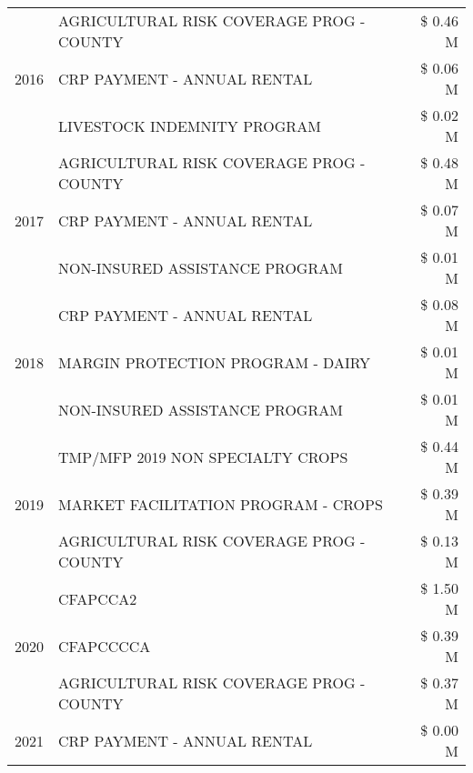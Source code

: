 \begin{tabular}{llr}
\cline{1-3}
\multirow[t]{3}{*}{2016} & AGRICULTURAL RISK COVERAGE PROG - COUNTY & \$ 0.46 M \\
 & CRP PAYMENT - ANNUAL RENTAL & \$ 0.06 M \\
 & LIVESTOCK INDEMNITY PROGRAM & \$ 0.02 M \\
\cline{1-3}
\multirow[t]{3}{*}{2017} & AGRICULTURAL RISK COVERAGE PROG - COUNTY & \$ 0.48 M \\
 & CRP PAYMENT - ANNUAL RENTAL & \$ 0.07 M \\
 & NON-INSURED ASSISTANCE PROGRAM & \$ 0.01 M \\
\cline{1-3}
\multirow[t]{3}{*}{2018} & CRP PAYMENT - ANNUAL RENTAL & \$ 0.08 M \\
 & MARGIN PROTECTION PROGRAM - DAIRY & \$ 0.01 M \\
 & NON-INSURED ASSISTANCE PROGRAM & \$ 0.01 M \\
\cline{1-3}
\multirow[t]{3}{*}{2019} & TMP/MFP 2019 NON SPECIALTY CROPS & \$ 0.44 M \\
 & MARKET FACILITATION PROGRAM - CROPS & \$ 0.39 M \\
 & AGRICULTURAL RISK COVERAGE PROG - COUNTY & \$ 0.13 M \\
\cline{1-3}
\multirow[t]{3}{*}{2020} & CFAPCCA2 & \$ 1.50 M \\
 & CFAPCCCCA & \$ 0.39 M \\
 & AGRICULTURAL RISK COVERAGE PROG - COUNTY & \$ 0.37 M \\
\cline{1-3}
2021 & CRP PAYMENT - ANNUAL RENTAL & \$ 0.00 M \\
\cline{1-3}
\bottomrule
\end{tabular}
